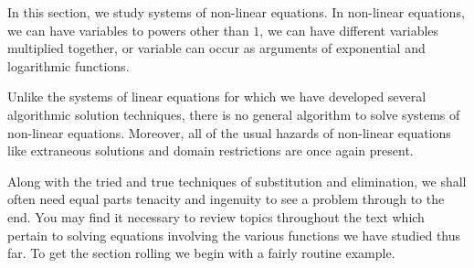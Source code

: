 

\setcounter{footnote}{0}

\label{NonLinearEquations}

In this section, we study systems of non-linear equations.   In non-linear equations, we can have variables to powers other than $1$, we can have different variables multiplied together, or variable can occur as arguments of exponential and logarithmic functions. 

Unlike the systems of linear equations for which we have developed several algorithmic solution techniques, there is no general algorithm to solve systems of non-linear equations.  Moreover, all of the usual hazards of non-linear equations like extraneous solutions and  domain restrictions are once again present.  

Along with the tried and true techniques of substitution and elimination, we shall often need equal parts tenacity and ingenuity to see a problem through to the end.  You may find it necessary to review topics throughout the text which pertain to solving equations involving the various functions we have studied thus far.  To get the section rolling we begin with a fairly routine example.

